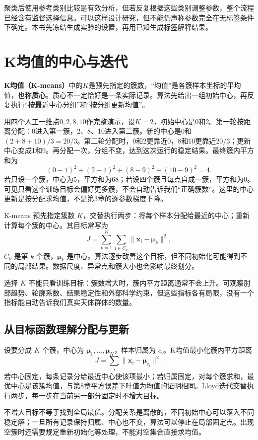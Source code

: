 聚类后使用参考类别比较是有效分析，但若反复根据这些类别调整参数，整个流程已经含有监督选择信息。可以这样设计研究，但不能仍声称参数完全在无标签条件下确定。本书先冻结生成实验的设置，再用已知生成标签解释结果。

\section{K均值的中心与迭代}

\textbf{K均值（K-means）}中的$K$是预先指定的簇数，“均值”是各簇样本坐标的平均值，也称\textbf{质心}。质心不一定恰好是一条实际记录。算法先给出一组初始中心，再反复执行“按最近中心分组”和“按分组更新均值”。

用四个人工一维点$0,2,8,10$作完整演示，设$K=2$，初始中心是0和2。第一轮按距离分配：0进入第一簇，2、8、10进入第二簇。新的中心是0和$(2+8+10)/3=20/3$。第二轮分配时，0和2更靠近0，8和10更靠近$20/3$；更新中心变成1和9。再分配一次，分组不变，达到这次运行的稳定结果。最终簇内平方和为
\[
(0-1)^2+(2-1)^2+(8-9)^2+(10-9)^2=4.
\]
若只设一个簇，中心为5，平方和为68；若设四个簇且每点自成一簇，平方和为0。可见只看这个训练目标会偏好更多簇，不会自动告诉我们“正确簇数”。这里的中心更新是按分配求均值，不是第3章的逐参数梯度下降。

K-means 预先指定簇数 $K$，交替执行两步：将每个样本分配给最近的中心；重新计算每个簇的中心。其目标常写为
\begin{equation}
J=\sum_{k=1}^K\sum_{i\in C_k}\|\mathbf x_i-\boldsymbol\mu_k\|^2,
\end{equation}
$C_k$ 是第 $k$ 个簇，$\boldsymbol\mu_k$ 是中心。算法逐步改善这个目标，但不同初始化可能得到不同的局部结果。数据尺度、异常点和簇大小也会影响最终划分。

选择 $K$ 不能只看训练目标：簇数增大时，簇内平方距离通常不会上升。可观察肘部趋势、轮廓系数、结果稳定性和外部科学约束，但这些指标各有局限，没有一个指标能自动告诉我们真实天体群体的数量。

\subsection{从目标函数理解分配与更新}
设要分成 $K$ 个簇，中心为 $\boldsymbol\mu_1,\ldots,\boldsymbol\mu_K$，样本归属为 $c_i$。K均值最小化簇内平方距离
\[
J=\sum_i\|\mathbf x_i-\boldsymbol\mu_{c_i}\|^2.
\]
若中心固定，每条记录分给最近中心使该项最小；若归属固定，对每个簇求和，最优中心是该簇均值，与第8章平方误差下叶值为均值的证明相同。Lloyd迭代交替执行两步，每一步在当前另一部分固定时不增大目标。

不增大目标不等于找到全局最优。分配关系是离散的，不同初始中心可以落入不同稳定解；一旦所有记录保持归属、中心也不变，算法可以停止在局部固定点。出现空簇时还需要规定重新初始化等处理，不能对空集合直接求均值。

